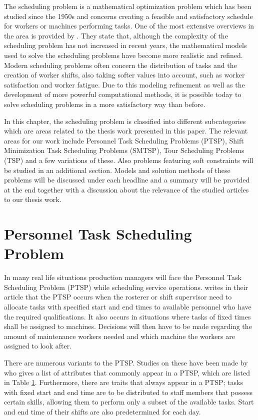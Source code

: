 
The scheduling problem is a mathematical optimization problem which has been studied since the 1950s and concerns creating a feasible and satisfactory schedule for workers or machines performing tasks. One of the most extensive overviews in the area is provided by \citet{ernst_2004}. They state that, although the complexity of the scheduling problem has not increased in recent years, the mathematical models used to solve the scheduling problems have become more realistic and refined. Modern scheduling problems often concern the distribution of tasks and the creation of worker shifts, also taking softer values into account, such as worker satisfaction and worker fatigue. Due to this modeling refinement as well as the development of more powerful computational methods, it is possible today to solve scheduling problems in a more satisfactory way than before.

In this chapter, the scheduling problem is classified into different subcategories which are areas related to the thesis work presented in this paper. The relevant areas for our work include Personnel Task Scheduling Problems (PTSP), Shift Minimization Task Scheduling Problems (SMTSP), Tour Scheduling Problems (TSP) and a few variations of these. Also problems featuring soft constraints will be studied in an additional section. Models and solution methods of these problems will be discussed under each headline and a summary will be provided at the end together with a discussion about the relevance of the studied articles to our thesis work.


\section{Personnel Task Scheduling Problem} \label{PTSP}

In many real life situations production managers will face the Personnel Task Scheduling Problem (PTSP) while scheduling service operations. \citet{krishnamoorthy_2001} writes in their article that the PTSP occurs when the rosterer or shift supervisor need to allocate tasks with specified start and end times to available personnel who have the required qualifications. It also occurs in situations where tasks of fixed times shall be assigned to machines. Decisions will then have to be made regarding the amount of maintenance workers needed and which machine the workers are assigned to look after.

There are numerous variants to the PTSP. Studies on these have been made by \citet{krishnamoorthy_2001} who gives a list of attributes that commonly appear in a PTSP, which are listed in Table \ref{PTSP}. Furthermore, there are traits that always appear in a PTSP; tasks with fixed start and end time are to be distributed to staff members that possess certain skills, allowing them to perform only a subset of the available tasks. Start and end time of their shifts are also predetermined for each day.

